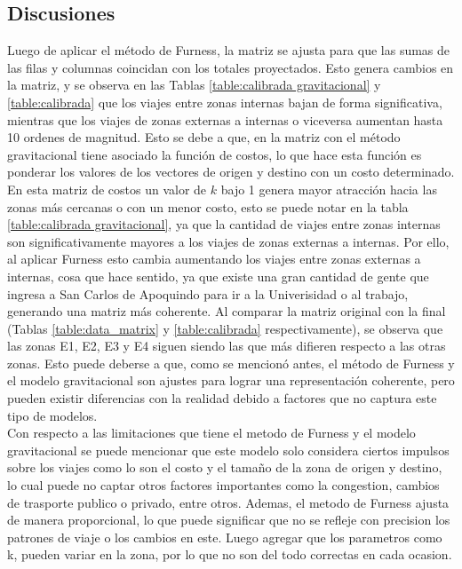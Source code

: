 \documentclass[letterpaper,12pt]{article}
\begin{document}
\subsection{Discusiones}

Luego de aplicar el método de Furness, la matriz se ajusta para que las sumas de las filas y columnas coincidan con los totales proyectados. Esto genera cambios en la matriz, y se observa en las Tablas \ref{table:calibrada gravitacional} y \ref{table:calibrada} que los viajes entre zonas internas bajan de forma significativa, mientras que los viajes de zonas externas a internas o viceversa aumentan hasta 10 ordenes de magnitud. Esto se debe a que, en la matriz con el método gravitacional tiene asociado la función de costos, lo que hace esta función es ponderar los valores de los vectores de origen y destino con un costo determinado. En esta matriz de costos un valor de $k$ bajo 1 genera mayor atracción hacia las zonas más cercanas o con un menor costo, esto se puede notar en la tabla \ref{table:calibrada gravitacional}, ya que la cantidad de viajes entre zonas internas son significativamente mayores a los viajes de zonas externas a internas. Por ello, al aplicar Furness esto cambia aumentando los viajes entre zonas externas a internas, cosa que hace sentido, ya que existe una gran cantidad de gente que ingresa a San Carlos de Apoquindo para ir a la Univerisidad o al trabajo, generando una matriz más coherente. Al comparar la matriz original con la final (Tablas \ref{table:data_matrix} y \ref{table:calibrada} respectivamente), se observa que las zonas E1, E2, E3 y E4 siguen siendo las que más difieren respecto a las otras zonas. Esto puede deberse a que, como se mencionó antes, el método de Furness y el modelo gravitacional son ajustes para lograr una representación coherente, pero pueden existir diferencias con la realidad debido a factores que no captura este tipo de modelos.\\

Con respecto a las limitaciones que tiene el metodo de Furness y el modelo gravitacional se puede mencionar que este modelo solo considera ciertos impulsos sobre los viajes como lo son el costo y el tamaño de la zona de origen y destino, lo cual puede no captar otros factores importantes como la congestion, cambios de trasporte publico o privado, entre otros. Ademas, el metodo de Furness ajusta de manera proporcional, lo que puede significar que no se refleje con precision los patrones de viaje o los cambios en este. Luego agregar que los parametros como k, pueden variar en la zona, por lo que no son del todo correctas en cada ocasion. \\
\end{document}
